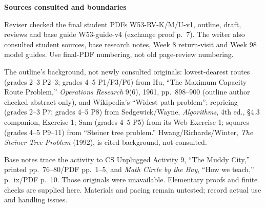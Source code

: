 \documentclass[11pt]{article}
\newcommand{\sub}[1]{\par\textbf{#1}\par\nobreak}
\begin{document}
\sub{Sources consulted and boundaries}
{\small
Reviser checked the final student PDFs W53-RV-K/M/U-v1, outline, draft, reviews and base guide W53-guide-v4 (exchange proof p.~7). The writer also consulted student sources, base research notes, Week 8 return-visit and Week 98 model guides. Use final-PDF numbering, not old page-review numbering.

The outline's background, not newly consulted originals: lowest-dearest routes (grades 2--3 P2--3; grades 4--5 P1/P3/P6) from Hu, ``The Maximum Capacity Route Problem,'' \textit{Operations Research} 9(6), 1961, pp.~898--900 (outline author checked abstract only), and Wikipedia's ``Widest path problem''; repricing (grades 2--3 P7; grades 4--5 P8) from Sedgewick/Wayne, \textit{Algorithms}, 4th ed., \S4.3 companion, Exercise 1; Sam (grades 4--5 P5) from its Web Exercise 1; squares (grades 4--5 P9--11) from ``Steiner tree problem.'' Hwang/Richards/Winter, \textit{The Steiner Tree Problem} (1992), is cited background, not consulted.

Base notes trace the activity to CS Unplugged Activity 9, ``The Muddy City,'' printed pp.~76--80/PDF pp.~1--5, and \textit{Math Circle by the Bay}, ``How we teach,'' p.~ix/PDF p.~10. Those originals were unavailable. Elementary proofs and finite checks are supplied here. Materials and pacing remain untested; record actual use and handling issues.
}
\end{document}
